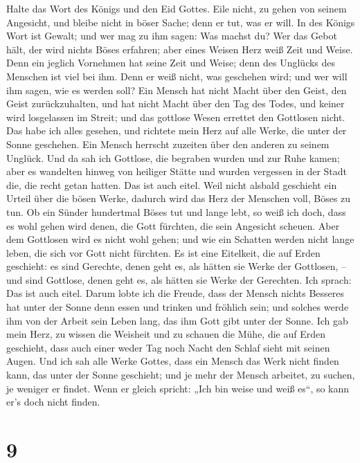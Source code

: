  Halte das Wort des Königs und den Eid Gottes.
 Eile nicht, zu gehen von seinem Angesicht, und bleibe
nicht in böser Sache; denn er tut, was er will.  In des
Königs Wort ist Gewalt; und wer mag zu ihm sagen: Was machst du?
 Wer das Gebot hält, der wird nichts Böses erfahren; aber
eines Weisen Herz weiß Zeit und Weise.  Denn ein jeglich
Vornehmen hat seine Zeit und Weise; denn des Unglücks des Menschen ist
viel bei ihm.  Denn er weiß nicht, was geschehen wird; und
wer will ihm sagen, wie es werden soll?  Ein Mensch hat
nicht Macht über den Geist, den Geist zurückzuhalten, und hat nicht
Macht über den Tag des Todes, und keiner wird losgelassen im Streit; und
das gottlose Wesen errettet den Gottlosen nicht.  Das habe
ich alles gesehen, und richtete mein Herz auf alle Werke, die unter der
Sonne geschehen. Ein Mensch herrscht zuzeiten über den anderen zu seinem
Unglück.  Und da sah ich Gottlose, die begraben wurden
und zur Ruhe kamen; aber es wandelten hinweg von heiliger Stätte und
wurden vergessen in der Stadt die, die recht getan hatten. Das ist auch
eitel.  Weil nicht alsbald geschieht ein Urteil über die
bösen Werke, dadurch wird das Herz der Menschen voll, Böses zu tun.
 Ob ein Sünder hundertmal Böses tut und lange lebt, so
weiß ich doch, dass es wohl gehen wird denen, die Gott fürchten, die
sein Angesicht scheuen.  Aber dem Gottlosen wird es nicht
wohl gehen; und wie ein Schatten werden nicht lange leben, die sich vor
Gott nicht fürchten.  Es ist eine Eitelkeit, die auf
Erden geschieht: es sind Gerechte, denen geht es, als hätten sie Werke
der Gottlosen, -- und sind Gottlose, denen geht es, als hätten sie Werke
der Gerechten. Ich sprach: Das ist auch eitel.  Darum
lobte ich die Freude, dass der Mensch nichts Besseres hat unter der
Sonne denn essen und trinken und fröhlich sein; und solches werde ihm
von der Arbeit sein Leben lang, das ihm Gott gibt unter der Sonne.
 Ich gab mein Herz, zu wissen die Weisheit und zu schauen
die Mühe, die auf Erden geschieht, dass auch einer weder Tag noch Nacht
den Schlaf sieht mit seinen Augen.  Und ich sah alle
Werke Gottes, dass ein Mensch das Werk nicht finden kann, das unter der
Sonne geschieht; und je mehr der Mensch arbeitet, zu suchen, je weniger
er findet. Wenn er gleich spricht: „Ich bin weise und weiß es``, so kann
er's doch nicht finden.

\hypertarget{section-8}{%
\section{9}\label{section-8}}

